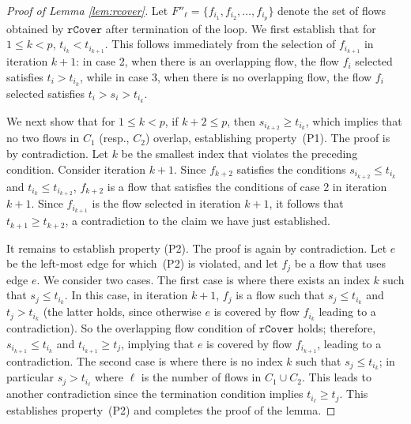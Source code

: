 \documentclass[a4paper,UKenglish]{lipics-v2016}
\theoremstyle{plain}
\begin{document}
\begin{proof}[Proof of Lemma \ref{lem:rcover}]
Let $F''_\ell = \{f_{i_1}, f_{i_2}, \ldots, f_{i_p}\}$ denote the set of flows obtained by $\mathtt{rCover}$ after termination of the loop.  We first establish that for $1 \le k < p$, $t_{i_k} < t_{i_{k+1}}$.  This follows immediately from the selection of $f_{i_{k+1}}$ in iteration $k+1$: in case 2, when there is an overlapping flow, the flow $f_i$ selected satisfies $t_i > t_{i_k}$, while in case 3, when there is no overlapping flow, the flow $f_i$ selected satisfies $t_i > s_i > t_{i_k}$.  

We next show that for $1 \le k < p$, if $k+2 \le p$, then $s_{i_{k+2}} \ge t_{i_k}$, which implies that no two flows in $C_1$ (resp., $C_2$) overlap, establishing property~(P1).  The proof is by contradiction.  Let $k$ be the smallest index that violates the preceding condition.  Consider iteration $k+1$.  Since $f_{k+2}$ satisfies the conditions $s_{i_{k+2}} \le t_{i_k}$ and $t_{i_k} \le t_{i_{k+2}}$, $f_{k+2}$ is a flow that satisfies the conditions of case 2 in iteration $k+1$.  Since $f_{i_{k+1}}$ is the flow selected in iteration $k+1$, it follows that $t_{k+1} \ge t_{k+2}$, a contradiction to the claim we have just established.

It remains to establish property (P2).  The proof is again by contradiction.  Let $e$ be the left-most edge for which~(P2) is violated, and let $f_j$ be a flow that uses edge $e$.  We consider two cases.  The first case is where there exists an index $k$ such that $s_j \le t_{i_k}$.  In this case, in iteration $k+1$, $f_j$ is a flow such that $s_j \le t_{i_k}$ and $t_j > t_{i_k}$ (the latter holds, since otherwise $e$ is covered by flow $f_{i_k}$ leading to a contradiction).  So the overlapping flow condition of $\mathtt{rCover}$ holds; therefore, $s_{i_{k+1}} \le t_{i_k}$ and $t_{i_{k+1}} \ge t_j$, implying that $e$ is covered by flow $f_{i_{k+1}}$, leading to a contradiction.  The second case is where there is no index $k$ such that $s_j \le t_{i_k}$; in particular $s_j > t_{i_\ell}$ where $\ell$ is the number of flows in $C_1 \cup C_2$.  This leads to another contradiction since the termination condition implies $t_{i_\ell} \ge t_j$.  This  establishes property~(P2) and completes the proof of the lemma.
\end{proof}
\end{document}
